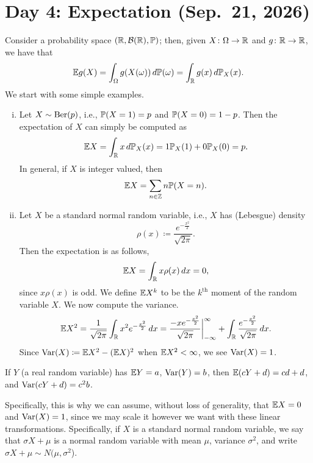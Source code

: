 \section{Day 4: Expectation (Sep.\ 21, 2026)}
Consider a probability space $(\mathbb R, \mathcal B(\mathbb R), \mathbb P)$; then, given $X \colon \Omega \to \mathbb R$ and $g \colon \mathbb R \to \mathbb R$, we have that
\[ \mathbb E g(X) = \int_\Omega g(X(\omega)) \, d\mathbb P(\omega) = \int_\mathbb R g(x) \, d\mathbb P_X(x). \]
We start with some simple examples.
\begin{enumerate}[(i)]
    \item Let $X \sim \operatorname{Ber}(p)$, i.e., $\mathbb P(X = 1) = p$ and $\mathbb P(X = 0) = 1 - p$. Then the expectation of $X$ can simply be computed as
    \[ \mathbb E X = \int_\mathbb R x \, d\mathbb P_X(x) = 1 \mathbb P_X(1) + 0 \mathbb P_X(0) = p. \]
    In general, if $X$ is integer valued, then
    \[ \mathbb E X = \sum_{n \in \mathbb Z} n \mathbb P(X = n). \]

    \item Let $X$ be a standard normal random variable, i.e., $X$ has (Lebesgue) density
    \[ \rho(x) \coloneq \frac{e^{-\frac{x^2}{2}}}{\sqrt{2\pi}}. \]
    Then the expectation is as follows,
    \[ \mathbb E X = \int_\mathbb R x \rho(x) \, dx = 0, \]
    since $x \rho(x)$ is odd. We define $\mathbb E X^k$ to be the $k^\text{th}$ moment of the random variable $X$. We now compute the variance.
    \[ \mathbb E X^2 = \frac{1}{\sqrt{2\pi}} \int_\mathbb R x^2 e^{-\frac{x^2}{2}} \, dx = \frac{-x e^{-\frac{x^2}{2}}}{\sqrt{2\pi}} \biggr\rvert_{-\infty}^\infty + \int_\mathbb R \frac{e^{-\frac{x^2}{2}}}{\sqrt{2\pi}} \, dx. \]
    Since $\operatorname{Var}(X) \coloneq \mathbb E X^2 - (\mathbb E X)^2$ when $\mathbb E X^2 < \infty$, we see $\operatorname{Var}(X) = 1$.
\end{enumerate}

\begin{fact}
    If $Y$ (a real random variable) has $\mathbb E Y = a$, $\operatorname{Var}(Y) = b$, then $\mathbb E(cY + d) = cd + d$, and $\operatorname{Var}(cY + d) = c^2 b$.
\end{fact}
Specifically, this is why we can assume, without loss of generality, that $\mathbb E X = 0$ and $\operatorname{Var}(X) = 1$, since we may scale it however we want with these linear transformations. Specifically, if $X$ is a standard normal random variable, we say that $\sigma X + \mu$ is a normal random variable with mean $\mu$, variance $\sigma^2$, and write $\sigma X + \mu \sim N(\mu, \sigma^2$).

